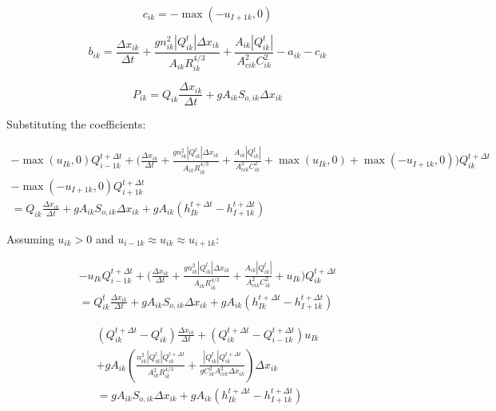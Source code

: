 \documentclass[11pt]{article}
\begin{document}
\begin{equation}
  c_{ik} = - \max(-u_{I+1k}, 0)
\end{equation}

\begin{equation}
  b_{ik} = \frac{\Delta x_{ik}}{\Delta t} + \frac{g n_{ik}^2 |Q_{ik}^t| \Delta x_{ik}}{A_{ik} R_{ik}^{4/3}} + \frac{A_{ik} |Q_{ik}^t|}{A_{cik}^2 C_{ik}^2} - a_{ik} - c_{ik}
\end{equation}

\begin{equation}
  P_{ik} = Q_{ik} \frac{\Delta x_{ik}}{\Delta t} + g A_{ik} S_{o,ik} \Delta x_{ik}
\end{equation}

Substituting the coefficients:

\begin{equation}
  \begin{split}
    - \max(u_{Ik}, 0) Q_{i - 1k}^{t + \Delta t} + \biggl(\frac{\Delta x_{ik}}{\Delta t} + \frac{g n_{ik}^2 |Q_{ik}^t| \Delta x_{ik}}{A_{ik} R_{ik}^{4/3}} + \frac{A_{ik} |Q_{ik}^t|}{A_{cik}^2 C_{ik}^2} + \max(u_{Ik}, 0) + \max(-u_{I+1k}, 0) \biggr) Q_{ik}^{t + \Delta t} \\ - \max(-u_{I+1k}, 0) Q_{i + 1k}^{t + \Delta t} \\ =
    Q_{ik} \frac{\Delta x_{ik}}{\Delta t} + g A_{ik} S_{o,ik} \Delta x_{ik} + g A_{ik} (h_{Ik}^{t + \Delta t} - h_{I+1k}^{t + \Delta t})
  \end{split}
\end{equation}

Assuming $u_{ik} > 0$ and $u_{i-1k} \approx u_{ik} \approx u_{i+1k}$:

\begin{equation}
  \begin{split}
    -u_{Ik} Q_{i - 1k}^{t + \Delta t} + \biggl(\frac{\Delta x_{ik}}{\Delta t} + \frac{g n_{ik}^2 |Q_{ik}^t| \Delta x_{ik}}{A_{ik} R_{ik}^{4/3}} + \frac{A_{ik} |Q_{ik}^t|}{A_{cik}^2 C_{ik}^2} + u_{Ik} \biggr) Q_{ik}^{t + \Delta t} \\ =
    Q_{ik}^t \frac{\Delta x_{ik}}{\Delta t} + g A_{ik} S_{o,ik} \Delta x_{ik} + g A_{ik} (h_{Ik}^{t + \Delta t} - h_{I+1k}^{t + \Delta t})
  \end{split}
\end{equation}

\begin{equation}
  \begin{split}
    (Q_{ik}^{t + \Delta t} - Q_{ik}^t) \frac{\Delta x_{ik}}{\Delta t} + (Q_{ik}^{t + \Delta t} - Q_{i - 1k}^{t + \Delta t}) u_{Ik} \\ + g A_{ik} (\frac{n_{ik}^2 |Q_{ik}^t| Q_{ik}^{t + \Delta t}}{A_{ik}^2 R_{ik}^{4/3}} + \frac{|Q_{ik}^t| Q_{ik}^{t + \Delta t}}{g C_{ik}^2 A_{cik}^2 \Delta x_{ik}}) \Delta x_{ik} \\ =
    g A_{ik} S_{o,ik} \Delta x_{ik} + g A_{ik} (h_{Ik}^{t + \Delta t} - h_{I+1k}^{t + \Delta t})
  \end{split}
\end{equation}
\end{document}
